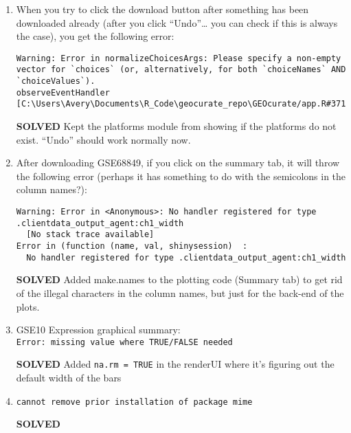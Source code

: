 \documentclass[]{article}
\begin{document}
\begin{enumerate}
\def\labelenumi{\arabic{enumi}.}
\item
  When you try to click the download button after something has been
  downloaded already (after you click ``Undo''\ldots{} you can check if
  this is always the case), you get the following error:

\begin{verbatim}
Warning: Error in normalizeChoicesArgs: Please specify a non-empty vector for `choices` (or, alternatively, for both `choiceNames` AND `choiceValues`).
observeEventHandler [C:\Users\Avery\Documents\R_Code\geocurate_repo\GEOcurate/app.R#371]
\end{verbatim}

  \textbf{SOLVED} Kept the platforms module from showing if the
  platforms do not exist. ``Undo'' should work normally now.
\item
  After downloading GSE68849, if you click on the summary tab, it will
  throw the following error (perhaps it has something to do with the
  semicolons in the column names?):

\begin{verbatim}
Warning: Error in <Anonymous>: No handler registered for type .clientdata_output_agent:ch1_width
  [No stack trace available]
Error in (function (name, val, shinysession)  : 
  No handler registered for type .clientdata_output_agent:ch1_width
\end{verbatim}

  \textbf{SOLVED} Added make.names to the plotting code (Summary tab) to
  get rid of the illegal characters in the column names, but just for
  the back-end of the plots.
\item
  GSE10 Expression graphical summary:
  \texttt{Error:\ missing\ value\ where\ TRUE/FALSE\ needed}

  \textbf{SOLVED} Added \texttt{na.rm\ =\ TRUE} in the renderUI where
  it's figuring out the default width of the bars
\item
  \texttt{cannot\ remove\ prior\ installation\ of\ package\ \textquotesingle{}mime\textquotesingle{}}

  \textbf{SOLVED}


\end{enumerate}
\end{document}
